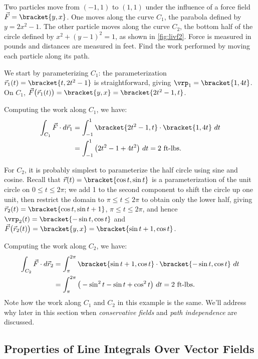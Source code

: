 {Two particles move from $(-1,1)$ to $(1,1)$ under the influence of a force field $\vec F =\bracket{y,x}$. One moves along the curve $C_1$, the parabola defined by $y = 2x^2-1$. The other particle moves along the curve $C_2$, the bottom half of the circle defined by $x^2+(y-1)^2=1$, as shown in \autoref{fig:livf2}. Force is measured in pounds and distances are measured in feet. Find the work performed by moving each particle along its path.}
{We start by parameterizing $C_1$: the parameterization $\vec r_1(t) =\bracket{t,2t^2-1}$ is straightforward, giving $\vrp_1 =\bracket{1,4t}$. On $C_1$, $\vec F\big(\vec r_1(t)\big) =\bracket{y,x}=\bracket{2t^2-1,t}$.

Computing the work along $C_1$, we have:
\begin{align*}
	\int_{C_1} \vec F\cdot d\vec r_1
	& = \int_{-1}^1\bracket{2t^2-1,t}\cdot\bracket{1,4t}\ dt \\
	&= \int_{-1}^1 \big(2t^2-1+4t^2\big)\ dt = 2 \text{ ft-lbs}.
\end{align*}

For $C_2$, it is probably simplest to parameterize the half circle using sine and cosine. Recall that $\vec r(t) =\bracket{\cos t,\sin t}$ is a parameterization of the unit circle on $0\leq t\leq 2\pi$; we add 1 to the second component to shift the circle up one unit, then restrict the domain to $\pi\leq t\leq 2\pi$  to obtain only the lower half, giving $\vec r_2(t) =\bracket{\cos t,\sin t+1}$, $\pi\leq t\leq 2\pi$, and hence $\vrp_2(t) =\bracket{-\sin t,\cos t}$ and $\vec F\big(\vec r_2(t)\big) =\bracket{y,x}=\bracket{\sin t+1,\cos t}$.

Computing the work along $C_2$, we have:
\begin{align*}
	\int_{C_2} \vec F\cdot d\vec r_2
	& = \int_{\pi}^{2\pi}\bracket{\sin t+1,\cos t}\cdot\bracket{-\sin t,\cos t}\ dt \\
	&= \int_{\pi}^{2\pi} \big(-\sin^2t-\sin t+\cos^2t\big)\ dt = 2 \text{ ft-lbs}.
\end{align*}
Note how the work along $C_1$ and $C_2$ in this example is the same. We'll address why later in this section when \emph{conservative fields} and \emph{path independence} are discussed.}

\subsection{Properties of Line Integrals Over Vector Fields}

